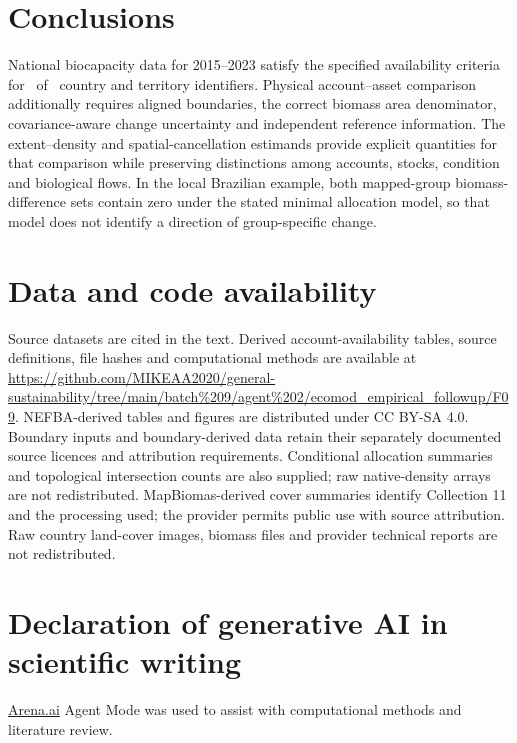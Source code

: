 \documentclass[11pt,a4paper]{article}
\begin{document}
\section{Conclusions}
National biocapacity data for 2015--2023 satisfy the specified availability criteria for \AccountPass\ of \CountryIDs\ country and territory identifiers. Physical account--asset comparison additionally requires aligned boundaries, the correct biomass area denominator, covariance-aware change uncertainty and independent reference information. The extent--density and spatial-cancellation estimands provide explicit quantities for that comparison while preserving distinctions among accounts, stocks, condition and biological flows. In the local Brazilian example, both mapped-group biomass-difference sets contain zero under the stated minimal allocation model, so that model does not identify a direction of group-specific change.

\section*{Data and code availability}
Source datasets are cited in the text. Derived account-availability tables, source definitions, file hashes and computational methods are available at \url{https://github.com/MIKEAA2020/general-sustainability/tree/main/batch%209/agent%202/ecomod_empirical_followup/F09}. NEFBA-derived tables and figures are distributed under CC BY-SA 4.0. Boundary inputs and boundary-derived data retain their separately documented source licences and attribution requirements. Conditional allocation summaries and topological intersection counts are also supplied; raw native-density arrays are not redistributed. MapBiomas-derived cover summaries identify Collection 11 and the processing used; the provider permits public use with source attribution. Raw country land-cover images, biomass files and provider technical reports are not redistributed.

\section*{Declaration of generative AI in scientific writing}
\href{http://Arena.ai}{Arena.ai} Agent Mode was used to assist with computational methods and literature review.
\end{document}
